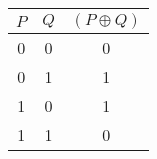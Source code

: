 \begin{tabular}{|c|c||c|}
\hline
$ P $ & $ Q $ & $ (P \oplus Q) $ \\
\hline
0 & 0 & 0 \\
0 & 1 & 1 \\
1 & 0 & 1 \\
1 & 1 & 0 \\
\hline
\end{tabular}
